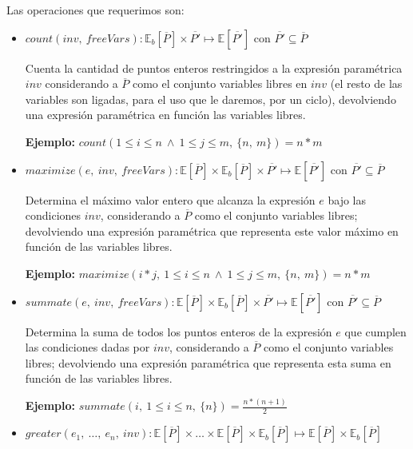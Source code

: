 \documentclass[12pt,a4paper]{article}
\begin{document}
				\noindent Las operaciones que requerimos son:

				\begin{itemize}
					\item
						$count(inv,\ freeVars): \mathbb{E}_b[\overline{P}] \times \overline{P'} \mapsto \mathbb{E}[\overline{P'}]$ con $\overline{P'} \subseteq \overline{P}$

						\vspace{5pt}
						Cuenta la cantidad de puntos enteros restringidos a la expresión paramétrica $inv$ considerando a $\overline{P}$ como el conjunto variables libres en $inv$ (el resto de las variables son ligadas, para el uso que le daremos, por un ciclo), devolviendo una expresión paramétrica en función las variables libres.

						\vspace{5pt}
						\textbf{Ejemplo:} $count(1 \leq i \leq n\ \wedge\ 1 \leq j \leq m,\ \{n,\ m\}) = n * m$
					\item
						$maximize(e,\ inv,\ freeVars): \mathbb{E}[\overline{P}] \times \mathbb{E}_b[\overline{P}] \times \overline{P'} \mapsto \mathbb{E}[\overline{P'}]$ con $\overline{P'} \subseteq \overline{P}$
						
						\vspace{5pt}
						Determina el máximo valor entero que alcanza la expresión $e$ bajo las condiciones $inv$, considerando a $\overline{P}$ como el conjunto variables libres; devolviendo una expresión paramétrica que representa este valor máximo en función de las variables libres.

						\vspace{5pt}
						\textbf{Ejemplo:} $maximize(i * j,\ 1 \leq i \leq n\ \wedge\ 1 \leq j \leq m,\ \{n,\ m\}) = n * m$
					\item
						$summate(e,\ inv,\ freeVars): \mathbb{E}[\overline{P}] \times \mathbb{E}_b[\overline{P}] \times \overline{P'} \mapsto \mathbb{E}[\overline{P'}]$ con $\overline{P'} \subseteq \overline{P}$
						
						\vspace{5pt}
						Determina la suma de todos los puntos enteros de la expresión $e$ que cumplen las condiciones dadas por $inv$, considerando a $\overline{P}$ como el conjunto variables libres; devolviendo una expresión paramétrica que representa esta suma en función de las variables libres.

						\vspace{5pt}
						\textbf{Ejemplo:} $summate(i,\ 1 \leq i \leq n,\ \{n\}) = \frac{n * (n + 1)}{2}$
					\item
						$greater(e_1,\ \dots,\ e_n,\ inv): \mathbb{E}[\overline{P}] \times \dots \times \mathbb{E}[\overline{P}] \times \mathbb{E}_b[\overline{P}] \mapsto \mathbb{E}[\overline{P}] \times \mathbb{E}_b[\overline{P}]$
						

\end{itemize}
\end{document}
